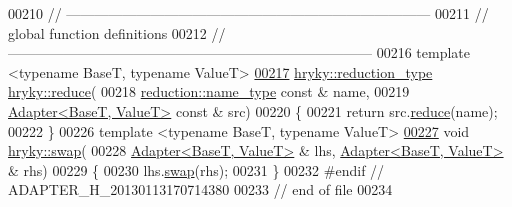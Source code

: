 \begin{DoxyCode}
00210 \textcolor{comment}{//
      ------------------------------------------------------------------------------}
00211 \textcolor{comment}{// global function definitions}
00212 \textcolor{comment}{//
      ------------------------------------------------------------------------------}
00216 \textcolor{comment}{}\textcolor{keyword}{template} <\textcolor{keyword}{typename} BaseT, \textcolor{keyword}{typename} ValueT>
\hypertarget{adapter_8h_source_l00217}{}\hyperlink{namespacehryky_abd67caf2c272d1836150c8c4974147f1}{00217} \hyperlink{classhryky_1_1_intrusive_ptr}{hryky::reduction_type} \hyperlink{namespacehryky_af41cb3af6766761da0ff21b84527a52c}{hryky::reduce}(
00218     \hyperlink{classhryky_1_1reduction_1_1_string}{reduction::name_type} \textcolor{keyword}{const} & name,
00219     \hyperlink{classhryky_1_1_adapter}{Adapter<BaseT, ValueT>} \textcolor{keyword}{const} & src)
00220 \{
00221     \textcolor{keywordflow}{return} src.\hyperlink{classhryky_1_1_adapter_a42532b43ac680d162bbc1a2e3ebc6b99}{reduce}(name);
00222 \}
00226 \textcolor{keyword}{template} <\textcolor{keyword}{typename} BaseT, \textcolor{keyword}{typename} ValueT>
\hypertarget{adapter_8h_source_l00227}{}\hyperlink{namespacehryky_a4282146df5ea2b68cb667896a2205909}{00227} \textcolor{keywordtype}{void} \hyperlink{namespacehryky_a4282146df5ea2b68cb667896a2205909}{hryky::swap}(
00228     \hyperlink{classhryky_1_1_adapter}{Adapter<BaseT, ValueT>} & lhs, \hyperlink{classhryky_1_1_adapter}{Adapter<BaseT, ValueT>} & rhs)
00229 \{
00230     lhs.\hyperlink{classhryky_1_1_adapter_ae95517793bc16f6ba623bc994bc17c43}{swap}(rhs);
00231 \}
00232 \textcolor{preprocessor}{#endif // ADAPTER\_H\_20130113170714380}
00233 \textcolor{preprocessor}{}\textcolor{comment}{// end of file}
00234 
\end{DoxyCode}
